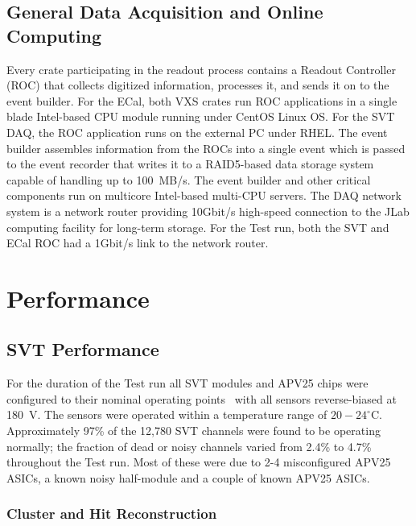 \documentclass[final,3p,times,twocolumn]{elsarticle}
\begin{document}
\subsection{General Data Acquisition and Online Computing}
\label{sec:daq}
Every crate participating in the readout process contains a Readout Controller (ROC) that 
collects digitized information, processes it, and sends it on to the event builder. For the ECal, both 
VXS crates run ROC applications in a single blade Intel-based CPU module running under CentOS 
Linux OS. For the SVT DAQ, the ROC application runs on the external PC under RHEL. 
The event builder assembles information from the ROCs into a single event which is passed to the 
event recorder that writes it to a RAID5-based data storage system capable of handling up to 
100~MB/s. The event builder and other critical components run on multicore Intel-based multi-CPU 
servers. The DAQ network system is a network router providing 10Gbit/s high-speed connection 
to the JLab computing facility for long-term storage. For the Test run, both the SVT and ECal ROC had a 
1Gbit/s link to the network router.






\section{Performance}

\subsection{SVT Performance}

For the duration of the Test run all SVT modules and APV25 chips were configured to their 
nominal operating points~\cite{Jones:1069892} with all sensors reverse-biased at 180~V.  The 
sensors were operated within a temperature range of  $20-24^\circ$C.
Approximately 97\% of the 12,780 SVT channels were found to
be operating normally;  the fraction of dead or noisy channels varied from 2.4\% to 4.7\% throughout 
the Test run. Most of these were due to 2-4 misconfigured APV25 ASICs, a known noisy 
half-module and a couple of known APV25 ASICs. 


\subsubsection{Cluster and Hit Reconstruction}
\end{document}
